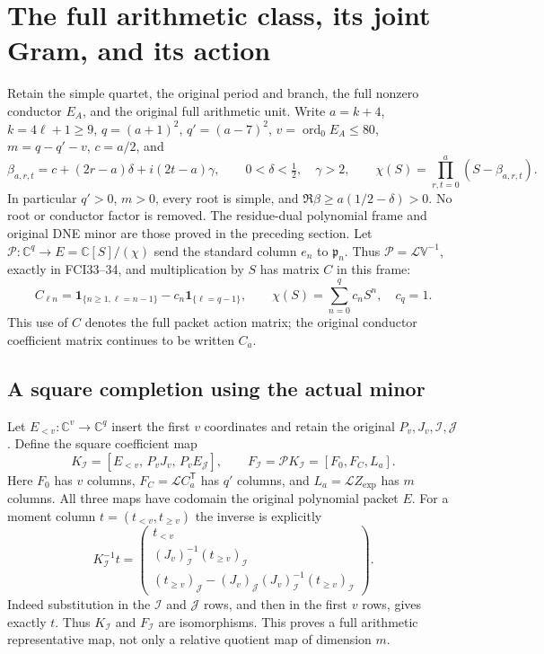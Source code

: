 \section{The full arithmetic class, its joint Gram, and its action}

Retain the simple quartet, the original period and branch, the full
nonzero conductor $E_A$, and the original full arithmetic unit.
Write $a=k+4$, $k=4\ell+1\ge9$,
$q=(a+1)^2$, $q'=(a-7)^2$, $v=\operatorname{ord}_0E_A\le80$,
$m=q-q'-v$, $c=a/2$, and
\[
 \beta_{a,r,t}=c+(2r-a)\delta+i(2t-a)\gamma,\qquad
 0<\delta<\tfrac12,\quad \gamma>2,\qquad
 \chi(S)=\prod_{r,t=0}^{a}(S-\beta_{a,r,t}).
 \tag{NCRP1}
\]
In particular $q'>0$, $m>0$, every root is simple, and
$\Re\beta\ge a(1/2-\delta)>0$. No root or conductor factor is
removed. The residue-dual polynomial frame and original DNE minor
are those proved in the preceding section. Let
$\mathscr P:\mathbb C^q\to E=\mathbb C[S]/(\chi)$ send the standard
column $e_n$ to $\mathfrak p_n$.
Thus $\mathscr P=\mathcal L\mathbb V^{-1}$, exactly in FCI33--34,
and multiplication by $S$ has matrix $C$ in this frame:
\[
 C_{\ell n}=\mathbf1_{\{n\ge1,\ell=n-1\}}
              -c_n\mathbf1_{\{\ell=q-1\}},\qquad
 \chi(S)=\sum_{n=0}^{q}c_nS^n,\quad c_q=1.
 \tag{NCRP2}
\]
This use of $C$ denotes the full packet action matrix; the original
conductor coefficient matrix continues to be written $C_a$.

\subsection{A square completion using the actual minor}

Let $E_{<v}:\mathbb C^v\to\mathbb C^q$ insert the first $v$
coordinates and retain the original $P_v,J_v,\mathcal I,\mathcal J$.
Define the square coefficient map
\[
 K_{\mathcal I}=
 [E_{<v},\,P_vJ_v,\,P_vE_{\mathcal J}],\qquad
 F_{\mathcal I}=\mathscr P K_{\mathcal I}=[F_0,F_C,L_a].
 \tag{NCRP3}
\]
Here $F_0$ has $v$ columns, $F_C=\mathcal L C_a^{\mathsf T}$
has $q'$ columns, and $L_a=\mathcal L Z_{\exp}$ has $m$ columns.
All three maps have codomain the original polynomial packet $E$.
For a moment column $t=(t_{<v},t_{\ge v})$ the inverse is explicitly
\[
 K_{\mathcal I}^{-1}t=
 \begin{pmatrix}
 t_{<v}\\
 (J_v)_{\mathcal I}^{-1}(t_{\ge v})_{\mathcal I}\\
 (t_{\ge v})_{\mathcal J}
       -(J_v)_{\mathcal J}(J_v)_{\mathcal I}^{-1}
                                (t_{\ge v})_{\mathcal I}
 \end{pmatrix}.
 \tag{NCRP4}
\]
Indeed substitution in the $\mathcal I$ and $\mathcal J$ rows,
and then in the first $v$ rows, gives exactly $t$.
Thus $K_{\mathcal I}$ and $F_{\mathcal I}$ are isomorphisms.
This proves a full arithmetic representative map, not only a
relative quotient map of dimension $m$.


